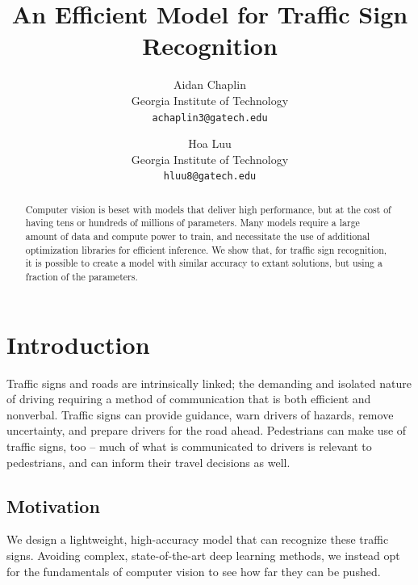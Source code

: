 \documentclass[10pt,twocolumn,letterpaper]{article}
\begin{document}
\title{An Efficient Model for Traffic Sign Recognition}

\author{Aidan Chaplin\\
Georgia Institute of Technology\\
{\tt\small achaplin3@gatech.edu}
\and
Hoa Luu\\
Georgia Institute of Technology\\
{\tt\small hluu8@gatech.edu}
}

\maketitle

\begin{abstract}
   Computer vision is beset with models that deliver high performance, but at the cost of having tens or hundreds of millions of parameters. Many models require a large amount of data and compute power to train, and necessitate the use of additional optimization libraries for efficient inference. We show that, for traffic sign recognition, it is possible to create a model with similar accuracy to extant solutions, but using a fraction of the parameters. 
\end{abstract}

\section{Introduction}
Traffic signs and roads are intrinsically linked; the demanding and isolated nature of driving requiring a method of communication that is both efficient and nonverbal. Traffic signs can provide guidance, warn drivers of hazards, remove uncertainty, and prepare drivers for the road ahead. Pedestrians can  make use of traffic signs, too -- much of what is communicated to drivers is relevant to pedestrians, and can inform their travel decisions as well. 

\subsection{Motivation}
We design a lightweight, high-accuracy model that  can recognize these traffic signs. Avoiding complex, state-of-the-art deep  learning methods, we instead opt for the fundamentals of computer vision  to see how far they can be pushed. 
\end{document}
